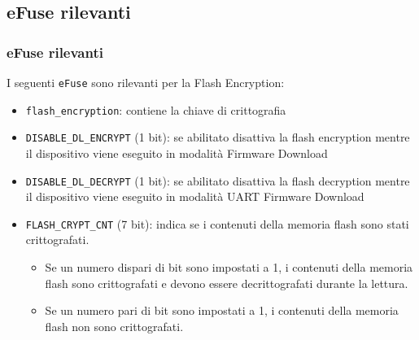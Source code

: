 \documentclass{beamer}
\begin{document}
\subsection{eFuse rilevanti}
\begin{frame}
\frametitle{eFuse rilevanti}
I seguenti \texttt{eFuse} sono rilevanti per la Flash Encryption:
\begin{itemize}
  \item \texttt{flash\_encryption}: contiene la chiave di
    crittografia

  \item \texttt{DISABLE\_DL\_ENCRYPT} (1 bit): se abilitato disattiva la flash encryption
    mentre il dispositivo viene eseguito in modalità Firmware Download

  \item \texttt{DISABLE\_DL\_DECRYPT} (1 bit): se abilitato disattiva la flash decryption
    mentre il dispositivo viene eseguito in modalità UART Firmware Download

  \item \texttt{FLASH\_CRYPT\_CNT} (7 bit): indica se
    i contenuti della memoria flash sono stati crittografati.
    \begin{itemize}
      \item Se un numero dispari di bit sono impostati a 1, i contenuti
        della memoria flash sono crittografati e devono essere decrittografati durante
        la lettura.

      \item Se un numero pari di bit sono impostati a 1, i contenuti della
        memoria flash non sono crittografati.
    \end{itemize}
\end{itemize}
\end{frame}
\end{document}
